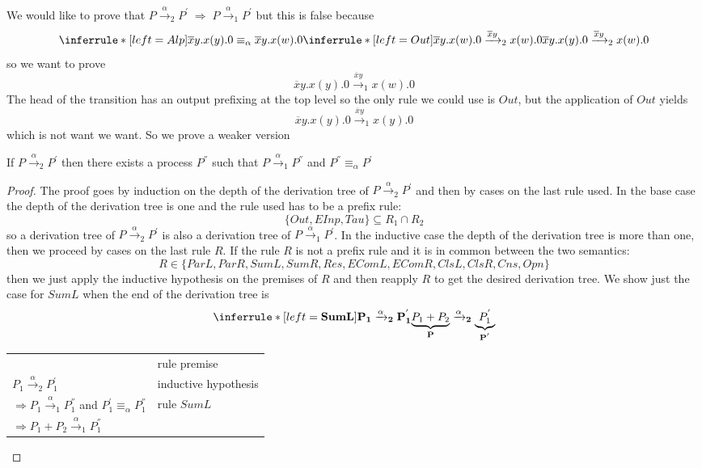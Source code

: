 We would like to prove that $P\xrightarrow{\alpha}_{2}P^{'}\; \Rightarrow\; P\xrightarrow{\alpha}_{1}P^{'}$ but this is false because
\[
  \inferrule* [left=Alp]{
      \overline{x}y.x(y).0 \equiv_{\alpha} \overline{x}y.x(w).0
    \\
      \inferrule* [left=Out]{
      }{
	\overline{x}y.x(w).0\xrightarrow{\overline{x}y}_{2}x(w).0
      }
  }{
    \overline{x}y.x(y).0\xrightarrow{\overline{x}y}_{2}x(w).0
  }
\]
so we want to prove 
\[
  \overline{x}y.x(y).0\xrightarrow{\overline{x}y}_{1}x(w).0
\] 
The head of the transition has an output prefixing at the top level so the only rule we could use is $Out$, but the application of $Out$ yields 
\[
  \overline{x}y.x(y).0\xrightarrow{\overline{x}y}_{1}x(y).0
\] 
which is not want we want. So we prove a weaker version
\begin{theorem}
  If $P\xrightarrow{\alpha}_{2}P^{'}$ then there exists a process $P^{''}$ such that $P\xrightarrow{\alpha}_{1}P^{''}$ and $P^{''}\equiv_{\alpha}P^{'}$

  \begin{proof}
    The proof goes by induction on the depth of the derivation tree of $P\xrightarrow{\alpha}_{2}P^{'}$ and then by cases on the last rule used. In the base case the depth of the derivation tree is one and the rule used has to be a prefix rule:
	\[
	  \{Out, EInp, Tau\}\subseteq R_{1}\cap R_{2}
	\]
	so a derivation tree of $P\xrightarrow{\alpha}_{2}P^{'}$ is also a derivation tree of $P\xrightarrow{\alpha}_{1}P^{'}$. In the inductive case the depth of the derivation tree is more than one, then we proceed by cases on the last rule $R$. If the rule $R$ is not a prefix rule and it is in common between the two semantics:
	\[
	  R\in \{ParL, ParR, SumL, SumR, Res, EComL, EComR, ClsL, ClsR, Cns, Opn\}
	\]
	then we just apply the inductive hypothesis on the premises of $R$ and then reapply $R$ to get the desired derivation tree. We show just the case for $SumL$ when the end of the derivation tree is 
	\[
	  \inferrule* [left=\bf{SumL}]{
	    P_{1}\xrightarrow{\alpha}_{2}P_{1}^{'}
	  }{
	    \underbrace{P_{1}+P_{2}}_{P}\xrightarrow{\alpha}_{2}\underbrace{P_{1}^{'}}_{P^{'}}
	  }
	\]
	\begin{center}
	  \begin{tabular}{ll}
	    &rule premise\\
	    $P_{1}\xrightarrow{\alpha}_{2}P_{1}^{'}$&inductive hypothesis\\
	    $\Rightarrow  P_{1}\xrightarrow{\alpha}_{1}P_{1}^{''}$ and $P_{1}^{'}\equiv_{\alpha}P_{1}^{''}$&rule $SumL$\\
	    $\Rightarrow  P_{1}+P_{2}\xrightarrow{\alpha}_{1}P_{1}^{''}$&\\
	  \end{tabular}
	\end{center}
	

\end{proof}
\end{theorem}
